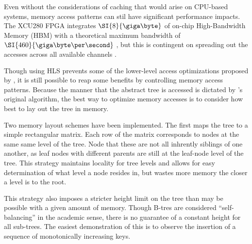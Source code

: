 
Even without the considerations of caching that would arise on CPU-based
systems, memory access patterns can stil have significant performance impacts.
The XCU280 FPGA integrates $\SI{8}{\giga\byte}$ of on-chip High-Bandwidth Memory
(HBM) with a theoretical maximum bandwidth of $\SI{460}{\giga\byte\per\second}$
\autocite{u280}, but this is contingent on spreading out the accesses across all
available channels \autocite{holzinger-ipdpsw-2021}.

Though using HLS prevents some of the lower-level access optimizations proposed
by \citeauthor{holzinger-ipdpsw-2021}, it is still possible to reap some
benefits by controlling memory access patterns. Because the manner that the
abstract tree is accessed is dictated by \citeauthor{b-link}'s original
algorithm, the best way to optimize memory accesses is to consider how best to
lay out the tree in memory.


\begin{figure}[H]
	\centering
\end{figure}

Two memory layout schemes have been implemented. The first maps the tree to a
simple rectangular matrix. Each row of the matrix corresponds to nodes at the
same same level of the tree. Node that these are not all inhrently siblings of
one another, as leaf nodes with different parents are still at the leaf-node
level of the tree. This strategy maintains locality for tree levels and allows
for easy determination of what level a node resides in, but wastes more memory
the closer a level is to the root.

This strategy also imposes a stricter height limit on the tree than may be
possible with a given amount of memory. Though B-tres are considered
``self-balancing'' in the academic sense, there is no guarantee of a constant
height for all sub-trees. The easiest demonstration of this is to observe the
insertion of a sequence of monotonically increasing keys.

